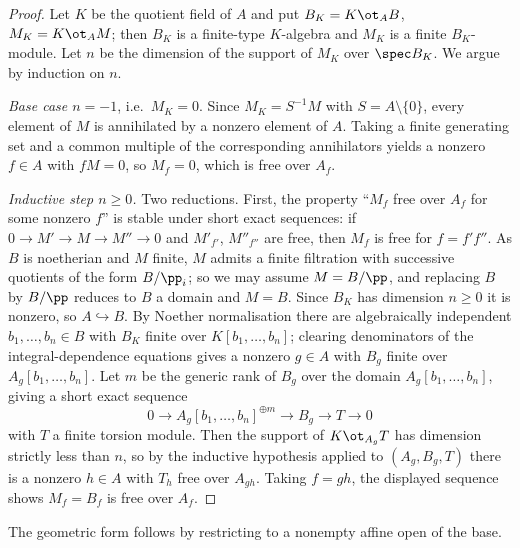 \begin{proof}
  Let \(K\) be the quotient field of \(A\) and put \(B_K = K\ot_A B\),
  \(M_K = K\ot_A M\); then \(B_K\) is a finite-type \(K\)-algebra and \(M_K\) is a
  finite \(B_K\)-module. Let \(n\) be the dimension of the support of \(M_K\) over
  \(\spec B_K\). We argue by induction on \(n\).

  \emph{Base case \(n=-1\)}, i.e.\ \(M_K=0\). Since \(M_K = S^{-1}M\) with
  \(S = A\setminus\{0\}\), every element of \(M\) is annihilated by a nonzero
  element of \(A\). Taking a finite generating set and a common multiple of the
  corresponding annihilators yields a nonzero \(f\in A\) with \(fM=0\), so
  \(M_f=0\), which is free over \(A_f\).

  \emph{Inductive step \(n\ge 0\).} Two reductions. First, the property
  ``\(M_f\) free over \(A_f\) for some nonzero \(f\)'' is stable under short exact
  sequences: if \(0\to M'\to M\to M''\to 0\) and \(M'_{f'}\), \(M''_{f''}\) are
  free, then \(M_f\) is free for \(f=f'f''\). As \(B\) is noetherian and \(M\)
  finite, \(M\) admits a finite filtration with successive quotients of the form
  \(B/\pp_i\); so we may assume \(M = B/\pp\), and replacing \(B\) by \(B/\pp\)
  reduces to \(B\) a domain and \(M=B\). Since \(B_K\) has dimension \(n\ge 0\) it
  is nonzero, so \(A\hookrightarrow B\). By Noether normalisation there are
  algebraically independent \(b_1,\dots,b_n\in B\) with \(B_K\) finite over
  \(K[b_1,\dots,b_n]\); clearing denominators of the integral-dependence
  equations gives a nonzero \(g\in A\) with \(B_g\) finite over
  \(A_g[b_1,\dots,b_n]\). Let \(m\) be the generic rank of \(B_g\) over the domain
  \(A_g[b_1,\dots,b_n]\), giving a short exact sequence
  \[
    0\to A_g[b_1,\dots,b_n]^{\oplus m}\to B_g \to T \to 0
  \]
  with \(T\) a finite torsion module. Then the support of \(K\ot_{A_g}T\) has
  dimension strictly less than \(n\), so by the inductive hypothesis applied to
  \((A_g, B_g, T)\) there is a nonzero \(h\in A\) with \(T_h\) free over
  \(A_{gh}\). Taking \(f=gh\), the displayed sequence shows \(M_f=B_f\) is free
  over \(A_f\).
\end{proof}

The geometric form follows by restricting to a nonempty affine open of the base.

